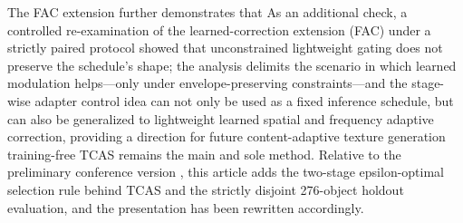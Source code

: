 \documentclass[times,twocolumn,final]{elsarticle}
\providecommand{\DIFadd}[1]{{\protect\color{blue} \sf #1}} %
\providecommand{\DIFdel}[1]{{\protect\color{red} \scriptsize #1}} %
\providecommand{\DIFaddbegin}{} %
\providecommand{\DIFaddend}{} %
\providecommand{\DIFdelbegin}{} %
\providecommand{\DIFdelend}{} %
\newcommand{\DIFscaledelfig}{0.5}
\newlength{\DIFdelgraphicswidth} %
\newlength{\DIFdelgraphicsheight} %
\newcommand{\DIFaddincludegraphics}[2][]{{\color{blue}\fbox{\DIFOincludegraphics[#1]{#2}}}} %
\newcommand{\DIFdelincludegraphics}[2][]{%
\sbox{\DIFdelgraphicsbox}{\DIFOincludegraphics[#1]{#2}}%
\settoboxwidth{\DIFdelgraphicswidth}{\DIFdelgraphicsbox} %
\settoboxtotalheight{\DIFdelgraphicsheight}{\DIFdelgraphicsbox} %
\scalebox{\DIFscaledelfig}{%
\parbox[b]{\DIFdelgraphicswidth}{\usebox{\DIFdelgraphicsbox}\\[-\baselineskip] \rule{\DIFdelgraphicswidth}{0em}}\llap{\resizebox{\DIFdelgraphicswidth}{\DIFdelgraphicsheight}{%
\setlength{\unitlength}{\DIFdelgraphicswidth}%
\begin{picture}(1,1)%
\thicklines\linethickness{2pt} %
{\color[rgb]{1,0,0}\put(0,0){\framebox(1,1){}}}%
{\color[rgb]{1,0,0}\put(0,0){\line( 1,1){1}}}%
{\color[rgb]{1,0,0}\put(0,1){\line(1,-1){1}}}%
\end{picture}%
}\hspace*{3pt}}} %
} %
\DeclareRobustCommand{\DIFaddbegin}{\DIFOaddbegin \let\includegraphics\DIFaddincludegraphics} %
\DeclareRobustCommand{\DIFaddend}{\DIFOaddend \let\includegraphics\DIFOincludegraphics} %
\DeclareRobustCommand{\DIFdelbegin}{\DIFOdelbegin \let\includegraphics\DIFdelincludegraphics} %
\DeclareRobustCommand{\DIFdelend}{\DIFOaddend \let\includegraphics\DIFOincludegraphics} %
\begin{document}
\DIFdelbegin \DIFdel{The FAC extension further demonstrates that }\DIFdelend \DIFaddbegin \DIFadd{As an additional check, a controlled re-examination of the learned-correction extension (FAC) under a strictly paired protocol showed that unconstrained lightweight gating does not preserve the schedule's shape; the analysis delimits the scenario in which learned modulation helps---only under envelope-preserving constraints---and }\DIFaddend the \DIFdelbegin \DIFdel{stage-wise adapter control idea can not only be used as a fixed inference schedule, but can also be generalized to lightweight learned spatial and frequency adaptive correction, providing a direction for future content-adaptive texture generation}\DIFdelend \DIFaddbegin \DIFadd{training-free TCAS remains the main and sole method. Relative to the preliminary conference version \cite{cadgraphics2026p75}, this article adds the two-stage epsilon-optimal selection rule behind TCAS and the strictly disjoint 276-object holdout evaluation, and the presentation has been rewritten accordingly}\DIFaddend .
\end{document}
